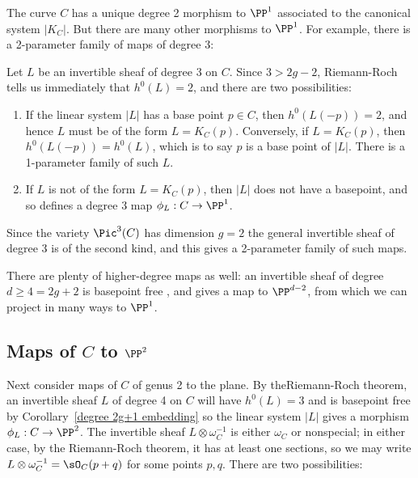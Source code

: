 The curve $C$ has a unique degree 2 morphism to $\PP^1$  associated to the canonical system $|K_C|$. But there are many other morphisms to $\PP^1$. For example, there is a 2-parameter
family of maps of degree 3:

 Let $L$ be an invertible sheaf of degree 3 on $C$. Since $3 > 2g-2$, Riemann-Roch tells us immediately that $h^0(L) = 2$, and there are two possibilities:

\begin{enumerate}
\item If the linear system $|L|$ has a base point $p \in C$, then $h^0(L(-p)) = 2$, and hence $L$ must be of the form $L = K_C(p)$. Conversely, if $L = K_C(p)$, then $h^0(L(-p)) = h^0(L)$, which is to say $p$ is a base point of $|L|$. There is a 1-parameter family of such $L$.

\item If $L$ is not of the form $L = K_C(p)$, then $|L|$ does not have a basepoint, and so defines a degree 3 map $\phi_L : C \to \PP^1$.
\end{enumerate}

Since the variety $\Pic^3(C)$ has dimension $g= 2$ the general invertible sheaf of degree 3 is of the second kind, and this gives a 2-parameter family of such maps.

There are plenty of higher-degree maps as well: an invertible sheaf of degree $d \geq 4 = 2g+2$ is basepoint free
, and gives a map to $\PP^{d-2}$, from which we can project in many ways
to $\PP^1$.

\subsection{Maps of $C$ to $\PP^2$} 
Next consider maps of $C$ of genus 2 to the plane. By theRiemann-Roch theorem, an invertible sheaf $L$ of degree 4 on $C$ will have $h^0(L) = 3$ and is basepoint free by Corollary~\ref{degree 2g+1 embedding} so the linear system $|L|$  gives a morphism $\phi_L : C \to \PP^2$. The invertible sheaf $L\otimes \omega_C^{-1}$ is either
$\omega_C$ or nonspecial; in either case, by the Riemann-Roch theorem, it has at least one sections, 
so we may write $L\otimes \omega_C^{-1} = \sO_C(p+q)$ for some points $p,q$. There are two possibilities:

